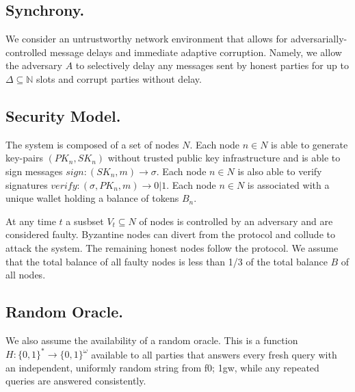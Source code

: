 \subsection{Synchrony.}\label{subsec:synchrony.}
We consider an untrustworthy network environment that allows for adversarially-controlled message delays and immediate adaptive corruption.
Namely, we allow the adversary $A$ to selectively delay any messages sent by honest parties for up to $\Delta \subseteq \mathbb{N}$ slots and corrupt parties without delay.

\subsection{Security Model.}\label{subsec:security-model.}
The system is composed of a set of nodes $N$.
Each node $n \in N$ is able to generate key-pairs ${(PK_n, SK_n)}$ without trusted public key infrastructure and is able to sign messages ${sign: (SK_n, m) \rightarrow \sigma}$.
Each node $n \in N$ is also able to verify signatures ${verify: (\sigma, PK_n, m) \rightarrow 0 | 1}$.
Each node $n \in N$ is associated with a unique wallet holding a balance of tokens $B_n$.

At any time $t$ a susbset ${V_t \subseteq N}$ of nodes is controlled by an adversary and are considered faulty.
Byzantine nodes can divert from the protocol and collude to attack the system.
The remaining honest nodes follow the protocol.
We assume that the total balance of all faulty nodes is less than 1/3 of the total balance $B$ of all nodes.

\subsection{Random Oracle.}\label{subsec:random-oracle.}
We also assume the availability of a random oracle.
This is a function $H: \{0,1\}^* \rightarrow \{0,1\}^\omega$ available to all parties that answers every fresh query with an independent, uniformly random string from f0; 1gw, while any repeated queries are answered consistently.


